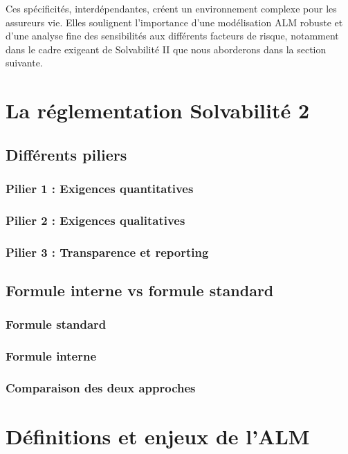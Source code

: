 \bigskip %

Ces spécificités, interdépendantes, créent un environnement complexe pour les assureurs vie. Elles soulignent l'importance d'une modélisation ALM robuste et d'une analyse fine des sensibilités aux différents facteurs de risque, notamment dans le cadre exigeant de Solvabilité II que nous aborderons dans la section suivante.


\section{La réglementation Solvabilité 2}
\subsection{Différents piliers}
\subsubsection{Pilier 1 : Exigences quantitatives}
\subsubsection{Pilier 2 : Exigences qualitatives}
\subsubsection{Pilier 3 : Transparence et reporting}

\subsection{Formule interne vs formule standard}
\subsubsection{Formule standard}
\subsubsection{Formule interne}
\subsubsection{Comparaison des deux approches}

\section{Définitions et enjeux de l’ALM}
